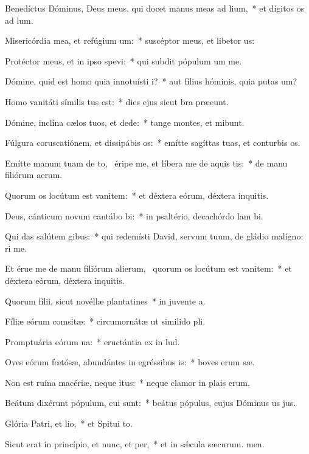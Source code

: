 \item Benedíctus Dóminus, Deus meus, qui docet manus meas ad lium,~* et dígitos os ad lum.
\item Misericórdia mea, et refúgium um:~* suscéptor meus, et libetor us:
\item Protéctor meus, et in ipso spevi:~* qui subdit pópulum um  me.
\item Dómine, quid est homo quia innotuísti i?~* aut fílius hóminis, quia putas um?
\item Homo vanitáti símilis tus est:~* dies ejus sicut bra præeunt.
\item Dómine, inclína cælos tuos, et dede:~* tange montes, et mibunt.
\item Fúlgura coruscatiónem, et dissipábis os:~* emítte sagíttas tuas, et conturbis os.
\item Emítte manum tuam de to,~\pscross{} éripe me, et líbera me de aquis tis:~* de manu filiórum aerum.
\item Quorum os locútum est vanitem:~* et déxtera eórum, déxtera inquitis.
\item Deus, cánticum novum cantábo bi:~* in psaltério, decachórdo lam bi.
\item Qui das salútem gibus:~* qui redemísti David, servum tuum, de gládio malígno: ri me.
\item Et érue me de manu filiórum alierum,~\pscross{} quorum os locútum est vanitem:~* et déxtera eórum, déxtera inquitis.
\item Quorum fílii, sicut novéllæ plantatines~* in juvente a.
\item Fíliæ eórum comsitæ:~* circumornátæ ut similido pli.
\item Promptuária eórum na:~* eructántia ex  in lud.
\item Oves eórum fœtósæ, abundántes in egréssibus is:~* boves erum sæ.
\item Non est ruína macériæ, neque itus:~* neque clamor in plais erum.
\item Beátum dixérunt pópulum, cui  sunt:~* beátus pópulus, cujus Dóminus us jus.
\item Glória Patri, et lio,~* et Spitui to.
\item Sicut erat in princípio, et nunc, et per,~* et in sǽcula sæcurum. men.
